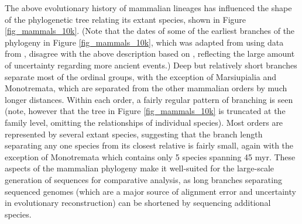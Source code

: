 The above evolutionary history of mammalian lineages has influenced
the shape of the phylogenetic tree relating its extant species, shown
in Figure \ref{fig_mammals_10k}. (Note that the dates of some of the
earliest branches of the phylogeny in Figure \ref{fig_mammals_10k},
which was adapted from \citet{Haussler2009} using data from
\citet{Hedges2009}, disagree with the above description based on
\citet{BinindaEmonds2007}, reflecting the large amount of uncertainty
regarding more ancient events.) Deep but relatively short branches
separate most of the ordinal groups, with the exception of
Marsiupialia and Monotremata, which are separated from the other
mammalian orders by much longer distances. Within each order, a fairly
regular pattern of branching is seen (note, however that the tree in
Figure \ref{fig_mammals_10k} is truncated at the family level,
omitting the relationships of individual species). Most orders are
represented by several extant species, suggesting that the branch
length separating any one species from its closest relative is fairly
small, again with the exception of Monotremata which contains only 5
species spanning 45 \ac{myr}. These aspects of the mammalian phylogeny
make it well-suited for the large-scale generation of sequences for
comparative analysis, as long branches separating sequenced genomes
(which are a major source of alignment error and uncertainty in
evolutionary reconstruction) can be shortened by sequencing additional
species.

